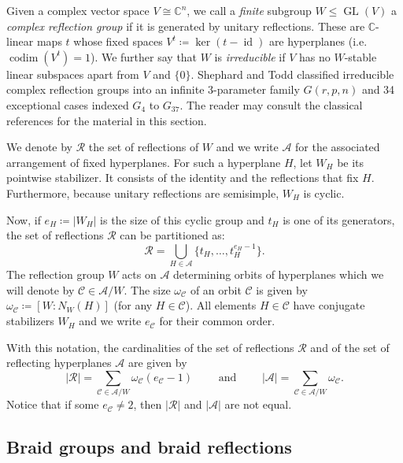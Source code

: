 \documentclass[ALCO, Unicode]{cedram}
\newcommand{\op}[1]{\operatorname{#1}}
\newcommand{\CC}{\mathbb{C}}
\newcommand{\op}[1]{\operatorname{#1}}
\begin{document}
Given a complex vector space $V\cong \CC^n$, we call a {\it finite} subgroup $W\leq \op{GL}(V)$ a {\it\color{blue} complex reflection group} if it is generated by unitary reflections. These are $\CC$-linear maps $t$ whose fixed spaces $V^t\coloneqq \op{ker}(t-\op{id})$ are hyperplanes (i.e. $\op{codim}(V^t)=1$). We further say that $W$ is {\it irreducible} if $V$ has no $W$-stable linear subspaces apart from $V$ and $\{0\}$. Shephard and Todd \cite{shephard-and-todd} classified irreducible complex reflection groups into an infinite $3$-parameter family $G(r,p,n)$ and 34 exceptional cases indexed $G_4$ to $G_{37}$. The reader may consult the classical references \cite{broue-book-braid-groups,kane-book-reflection-groups,lehrer-taylor-book} for the material in this section.


We denote by $\mathcal{R}$ the set of reflections of $W$ and we write $\mathcal{A}$ for the associated arrangement of fixed hyperplanes. For such a hyperplane $H$, let $W_H$ be its pointwise stabilizer. It consists of the identity and the reflections that fix $H$. Furthermore, because unitary reflections are semisimple, $W_H$ is cyclic.

    
Now, if $e_H\coloneqq |W_H|$ is the size of this cyclic group and $t_H$ is one of its generators, the set of reflections $\mathcal{R}$ can be partitioned as:\begin{equation} \mathcal{R}=\bigcup_{H\in\mathcal{A}}\{ t_H,\ldots, t_H^{e_H-1} \}.\label{EQ: Reflection set partition into cyclis}\end{equation}
The reflection group $W$ acts on $\mathcal{A}$ determining orbits of hyperplanes which we will denote by $\mathcal{C}\in\mathcal{A}/W$. The size $\omega_{\mathcal{C}}$ of an orbit $\mathcal{C}$ is given by $\omega_{\mathcal{C}}\coloneqq [W:N_W(H)]$ (for any $H\in \mathcal{C}$). All elements $H\in\mathcal{C}$ have conjugate stabilizers $W_H$ and we write $e_{\mathcal{C}}$ for their common order.

With this notation, the cardinalities of the set of reflections $\mathcal{R}$ and of the set of reflecting hyperplanes $\mathcal{A}$ are given by $$|\mathcal{R}|=\sum_{\mathcal{C}\in\mathcal{A}/W}\omega_{\mathcal{C}}(e_{\mathcal{C}}-1)\quad\quad\text{ and }\quad\quad |\mathcal{A}|=\sum_{\mathcal{C}\in\mathcal{A}/W}\omega_{\mathcal{C}}.$$
Notice that if some $e_{\mathcal{C}}\neq 2$, then $|\mathcal{R}|$ and $|\mathcal{A}|$ are not equal.
\subsection{Braid groups and braid reflections}
\label{Section: Braid groups and generators of the monodromy}
\end{document}
